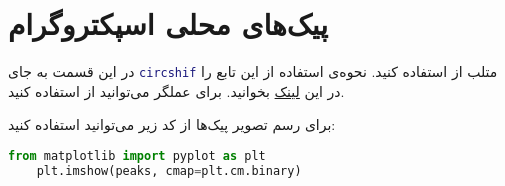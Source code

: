 \documentclass{utsignal}
\begin{document}
	\section*{پیک‌های محلی اسپکتروگرام} \label{ssec:local-peaks}
	در این قسمت به جای \lstinline[language=Matlab]{circshif} متلب از  استفاده کنید. نحوه‌ی استفاده از این تابع را در این \href{https://docs.scipy.org/doc/numpy/reference/generated/numpy.roll.html}{لینک} بخوانید. برای عملگر \lr{\&} می‌توانید از  استفاده کنید.
	
	برای رسم تصویر پیک‌ها از کد زیر می‌توانید استفاده کنید:
	\begin{latin}
		\begin{lstlisting}[language=Python]
	from matplotlib import pyplot as plt
	plt.imshow(peaks, cmap=plt.cm.binary)\end{lstlisting}
	\end{latin}
\end{document}
